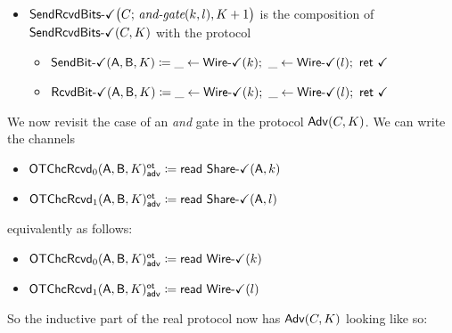 \begin{itemize}
\item $\mathsf{SendRcvdBits}\textsf{-}\checkmark\big(C; \, \textit{and-gate}(k,l),K+1\big)$ is the composition of $\mathsf{SendRcvdBits}\textsf{-}\checkmark(C,K)$ with the protocol
\begin{itemize}
\item {\color{teal} $\SendBitOk(\A,\B,K) \coloneqq \_ \leftarrow \WireOk(k); \ \_ \leftarrow \WireOk(l); \ \ret{\checkmark}$}
\item {\color{teal} $\RcvdBitOk(\A,\B,K) \coloneqq \_ \leftarrow \WireOk(k); \ \_ \leftarrow \WireOk(l); \ \ret{\checkmark}$}
\end{itemize}
\end{itemize}

\noindent We now revisit the case of an \emph{and} gate in the protocol $\mathsf{Adv}(C,K)$. We can write the channels
\begin{itemize}
\item {\color{blue} $\mathsf{OTChcRcvd}_0(\mathsf{A},\mathsf{B},K)^{\mathsf{ot}}_{\mathsf{adv}} \coloneqq \mathsf{read} \ \mathsf{Share}\textsf{-}\checkmark(\mathsf{A},k)$}
\item {\color{blue} $\mathsf{OTChcRcvd}_1(\mathsf{A},\mathsf{B},K)^{\mathsf{ot}}_{\mathsf{adv}} \coloneqq \mathsf{read} \ \mathsf{Share}\textsf{-}\checkmark(\mathsf{A},l)$}
\end{itemize}
equivalently as follows:
\begin{itemize}
\item {\color{blue} $\mathsf{OTChcRcvd}_0(\mathsf{A},\mathsf{B},K)^{\mathsf{ot}}_{\mathsf{adv}} \coloneqq \mathsf{read} \ \mathsf{Wire}\textsf{-}\checkmark(k)$}
\item {\color{blue} $\mathsf{OTChcRcvd}_1(\mathsf{A},\mathsf{B},K)^{\mathsf{ot}}_{\mathsf{adv}} \coloneqq \mathsf{read} \ \mathsf{Wire}\textsf{-}\checkmark(l)$}
\end{itemize}
So the inductive part of the real protocol now has $\mathsf{Adv}(C,K)$ looking like so:

